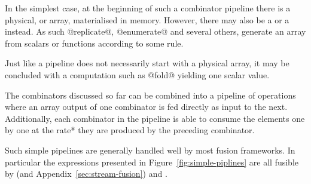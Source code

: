 \documentclass[preamble.tex]{subfiles}
\begin{document}
In the simplest case, at the beginning of such a combinator pipeline there is a physical, or \imanifest array, materialised in memory. However, there may also be a  or a \igencomb instead. As such @replicate@, @enumerate@ and several others, generate an array from scalars or functions according to some rule.

Just like a pipeline does not necessarily start with a physical array, it may be concluded with a computation such as @fold@ yielding one scalar value.

The combinators discussed so far can be combined into a pipeline of operations where an array output of one combinator is fed directly as input to the next. Additionally, each combinator in the pipeline is able to consume the elements one by one at the \*rate* they are produced by the preceding combinator.


Such simple pipelines are generally handled well by most fusion frameworks. In particular the expressions presented in Figure~\ref{fig:simple-piplines} are all fusible by  \cite{CLS07} (and Appendix~\ref{sec:stream-fusion}) and  \cite{CK01}.
\end{document}
